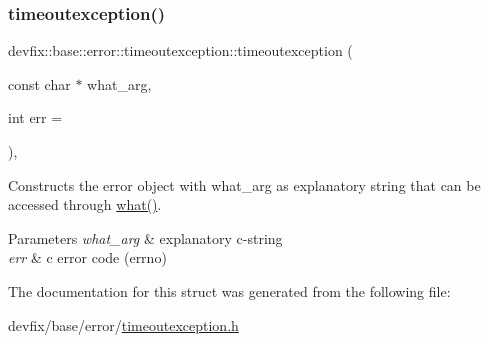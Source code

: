 \subsubsection{\texorpdfstring{timeoutexception()}{timeoutexception()}\hspace{0.1cm}{\footnotesize\ttfamily [2/2]}}
{\footnotesize\ttfamily devfix\+::base\+::error\+::timeoutexception\+::timeoutexception (\begin{DoxyParamCaption}\item[{const char $\ast$}]{what\+\_\+arg,  }\item[{int}]{err = {} }\end{DoxyParamCaption})\hspace{0.3cm}{\ttfamily [inline]}, {\ttfamily [explicit]}}

Constructs the error object with what\+\_\+arg as explanatory string that can be accessed through \hyperlink{structdevfix_1_1base_1_1error_1_1baseexception_a16327152a55d65b1e537825231fbd452}{what()}. 
\begin{DoxyParams}{Parameters}
{\em what\+\_\+arg} & explanatory c-\/string \\
\hline
{\em err} & c error code (errno) \\
\hline
\end{DoxyParams}


The documentation for this struct was generated from the following file\+:\begin{DoxyCompactItemize}
\item 
devfix/base/error/\hyperlink{timeoutexception_8h}{timeoutexception.\+h}\end{DoxyCompactItemize}
